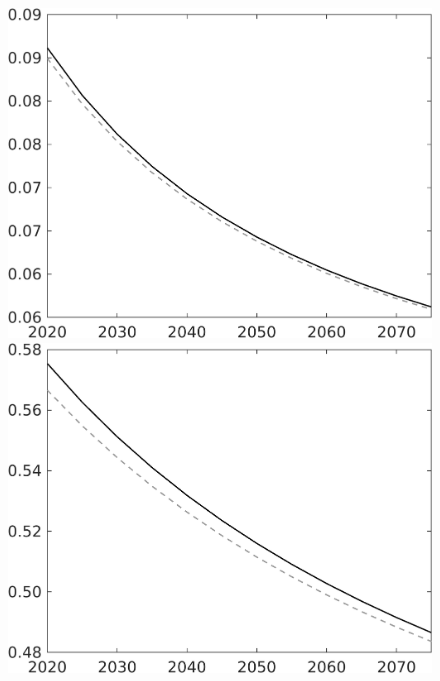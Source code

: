 \begin{figure}[h!!]
\begin{minipage}[]{0.32\textwidth}
	\end{minipage}		
	\begin{minipage}[]{0.32\textwidth}
		\includegraphics[width=1\textwidth]{../../codding_model/own_basedOnFried/optimalPol_010922_revision/figures/all_13Sept22/CompTaul_LFBAU_Reg0_sg_spillover0_nsk1_xgr0_sep1_countec0_GovRev1_etaa0.79_lgd0.png}
	\end{minipage}	
	\begin{minipage}[]{0.32\textwidth}
		\includegraphics[width=1\textwidth]{../../codding_model/own_basedOnFried/optimalPol_010922_revision/figures/all_13Sept22/CompTaul_LFBAU_Reg0_sn_spillover0_nsk1_xgr0_sep1_countec0_GovRev1_etaa0.79_lgd0.png}

\end{minipage}
\end{figure}
